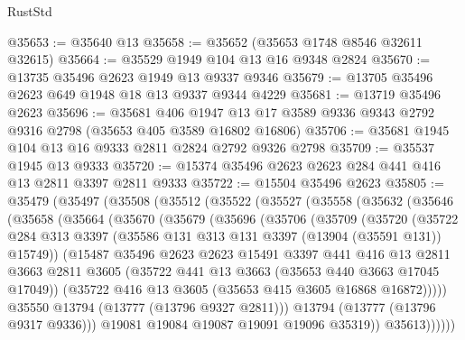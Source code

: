 \begin{lexlean}{RustStd}
\begin{coremodule}
@35653 := @35640 @13
@35658 := @35652 (@35653 @1748 @8546 @32611 @32615)
@35664 := @35529 @1949 @104 @13 @16 @9348 @2824
@35670 := @13735 @35496 @2623 @1949 @13 @9337 @9346
@35679 := @13705 @35496 @2623 @649 @1948 @18 @13 @9337 @9344 @4229
@35681 := @13719 @35496 @2623
@35696 := @35681
    @406
    @1947
    @13
    @17
    @3589
    @9336
    @9343
    @2792
    @9316
    @2798
    (@35653 @405 @3589 @16802 @16806)
@35706 := @35681 @1945 @104 @13 @16 @9333 @2811 @2824 @2792 @9326 @2798
@35709 := @35537 @1945 @13 @9333
@35720 := @15374 @35496 @2623 @2623 @284 @441 @416 @13 @2811 @3397 @2811 @9333
@35722 := @15504 @35496 @2623
@35805 := @35479
    (@35497
      (@35508
        (@35512
          (@35522
            (@35527
              (@35558
                (@35632
                  (@35646
                    (@35658
                      (@35664
                        (@35670
                          (@35679
                            (@35696
                              (@35706
                                (@35709
                                  (@35720
                                    (@35722
                                      @284
                                      @313
                                      @3397
                                      (@35586 @131 @313 @131 @3397 (@13904 (@35591 @131)) @15749))
                                    (@15487
                                      @35496
                                      @2623
                                      @2623
                                      @15491
                                      @3397
                                      @441
                                      @416
                                      @13
                                      @2811
                                      @3663
                                      @2811
                                      @3605
                                      (@35722 @441 @13 @3663 (@35653 @440 @3663 @17045 @17049))
                                      (@35722 @416 @13 @3605 (@35653 @415 @3605 @16868 @16872)))))
                                @35550
                                @13794
                                (@13777 (@13796 @9327 @2811)))
                              @13794
                              (@13777 (@13796 @9317 @9336)))
                            @19081
                            @19084
                            @19087
                            @19091
                            @19096
                            @35319))
                        @35613))))))

\end{coremodule}
\end{lexlean}
